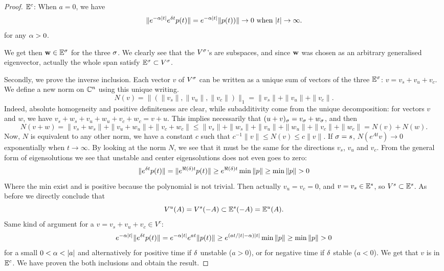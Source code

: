 \begin{proof}
$\mathbb{E}^c$: When $a=0$, we have
$$\|e^{-\alpha |t|}e^{\delta t}p(t)\|
= e^{-\alpha |t|}\|p(t))\| \to0 \text{ when }|t|\to\infty.$$
for any $\alpha>0$. 

We get then $\mathbf{w} \in \mathbb{E}^\sigma$ for the three $\sigma$. We clearly see that the $V^\sigma$'s are subspaces, and since $\mathbf{w}$ was chosen as an arbitrary generalised eigenvector, actually the whole span satisfy $\mathbb{E}^\sigma\subset V^\sigma$.

Secondly, we prove the inverse inclusion.
Each vector $v$ of $V^\sigma$ can be written as a unique sum of vectors of the three $\mathbb{E}^\sigma$: $v = v_s + v_u + v_c$. We define a new norm on $\mathbb{C}^n$ using this unique writing. 
$$N(v)= \big\|(\|v_s\|,\|v_u\|,\|v_c\|)\big\|_1 = \|v_s\|+\|v_u\|+\|v_c\|.$$ Indeed, absolute homogeneity and positive definiteness are clear, while subadditivity come from the unique decomposition: for vectors $v$ and $w$, we have $v_s+w_s + v_u+w_u + v_c+w_c=v+u$. This implies necessarily that $(u+v)_\sigma=v_\sigma + w_\sigma$, and then
$$N(v+w) = \|v_s+w_s\|+\|v_u+w_u\|+\|v_c+w_c\| \leq \|v_s\|+\|w_s\|+\|v_u\|+\|w_u\|+\|v_c\|+ \|w_c\|= N(v)+N(w).$$
Now, $N$ is equivalent to any other norm, \ie we have a constant $c$ such that $c^{-1}\|v\|\leq N(v)\leq c\|v\|$.
If $\sigma=s$, $N(e^{At}v)\to0$ exponentially when $t\to\infty$. By looking at the norm $N$, we see that it must be the same for the directions $v_s$, $v_u$ and $v_c$. From the general form of eigensolutions we see that unstable and center eigensolutions does not even goes to zero: 
$$\|e^{\d t}p(t)\|
=\|e^{\Re(\d)t}p(t)\|
\geq e^{\Re(\d)t}\min\|p\|\geq \min\|p\|>0$$
Where the min exist and is positive because the polynomial is not trivial. Then actually $v_u=v_c=0$, and $v = v_s\in \mathbb{E}^s$, so $V^s\subset \mathbb{E}^s$. As before we directly conclude that $$V^u(A)=V^s(-A)\subset \mathbb{E}^s(-A)=\mathbb{E}^u(A).$$ Same kind of argument for a $v=v_s+v_u+v_c\in V^c$: 
$$e^{-\a|t|}\|e^{\d t}p(t)\|
=e^{-\a|t|}e^{at}\|p(t)\|
\geq e^{(at/|t|-\a)|t|}\min\|p\|\geq \min\|p\|>0$$
for a small $0<\a<|a|$ and alternatively for positive time if $\delta$ unstable ($a>0$), or for negative time if $\delta$ stable ($a<0$). We get that $v$ is in $\mathbb{E}^c$.
We have proven the both inclusions and obtain the result.
\end{proof}
